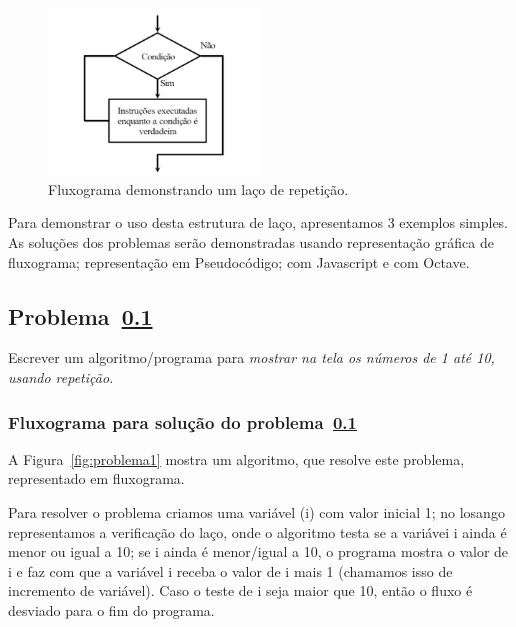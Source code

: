\begin{figure}[h]
  \begin{center}
    \includegraphics[width=0.5\textwidth]{img/laco-while.png}
    \caption{Fluxograma demonstrando um laço de repetição.}
    \label{fig:lacosimples}
  \end{center}
\end{figure}

Para demonstrar o uso desta estrutura de laço, apresentamos 3 exemplos simples. As soluções dos problemas serão demonstradas usando representação gráfica de fluxograma;  representação em Pseudocódigo; com Javascript e com Octave. 

\subsection{Problema~\ref{problema(while1)}}
\label{problema(while1)}
Escrever um algoritmo/programa para \emph{mostrar na tela os números de 1 até 10, usando repetição.}

\subsubsection{Fluxograma para solução do problema~\ref{problema(while1)}}
A Figura~\ref{fig:problema1} mostra um algoritmo, que resolve este problema, representado em fluxograma. 

Para resolver o problema criamos uma variável (i) com valor inicial 1; no losango representamos a verificação do laço, onde o algoritmo testa se a variávei i ainda é menor ou igual a 10; se i ainda é menor/igual a 10, o programa mostra o valor de i e faz com que a variável i receba o valor de i mais 1 (chamamos isso de incremento de variável). Caso o teste de i seja maior que 10, então o fluxo é desviado para o fim do programa.

